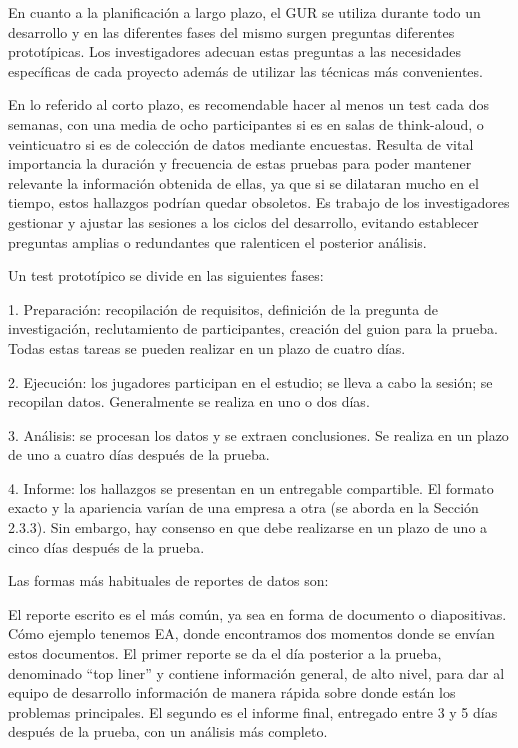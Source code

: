 En cuanto a la planificación a largo plazo, el GUR se utiliza durante todo un desarrollo y en las diferentes fases del mismo surgen preguntas diferentes prototípicas. Los investigadores adecuan estas preguntas a las necesidades específicas de cada proyecto además de utilizar las técnicas más convenientes.

En lo referido al corto plazo, es recomendable hacer al menos un test cada dos semanas, con una media de ocho participantes si es en salas de think-aloud, o veinticuatro si es de colección de datos mediante encuestas. Resulta de vital importancia la duración y frecuencia de estas pruebas para poder mantener relevante la información obtenida de ellas, ya que si se dilataran mucho en el tiempo, estos hallazgos podrían quedar obsoletos. Es trabajo de los investigadores gestionar y ajustar las sesiones a los ciclos del desarrollo, evitando establecer preguntas amplias o redundantes que ralenticen el posterior análisis.

Un test prototípico se divide en las siguientes fases:

1. Preparación: recopilación de requisitos, definición de la pregunta de investigación, reclutamiento de participantes, creación del guion para la prueba. Todas estas tareas se pueden realizar en un plazo de cuatro días.

2. Ejecución: los jugadores participan en el estudio; se lleva a cabo la sesión; se recopilan datos. Generalmente se realiza en uno o dos días.

3. Análisis: se procesan los datos y se extraen conclusiones. Se realiza en un plazo de uno a cuatro días después de la prueba.

4. Informe: los hallazgos se presentan en un entregable compartible. El formato exacto y la apariencia varían de una empresa a otra (se aborda en la Sección 2.3.3). Sin embargo, hay consenso en que debe realizarse en un plazo de uno a cinco días después de la prueba.

Las formas más habituales de reportes de datos son:

El reporte escrito es el más común, ya sea en forma de documento o diapositivas. Cómo ejemplo tenemos EA, donde encontramos dos momentos donde se envían estos documentos. El primer reporte se da el día posterior a la prueba, denominado “top liner” y contiene información general, de alto nivel, para dar al equipo de desarrollo información de manera rápida sobre donde están los problemas principales. El segundo es el informe final, entregado entre 3 y 5 días después de la prueba, con un análisis más completo.

